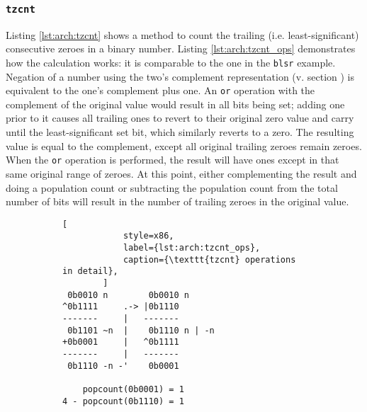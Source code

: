 \subsubsection{\texttt{tzcnt}}

Listing \ref{lst:arch:tzcnt} shows a method to count the trailing (i.e.
least-significant) consecutive zeroes in a binary number.  Listing
\ref{lst:arch:tzcnt_ops} demonstrates how the calculation works: it is
comparable to the one in the \texttt{blsr} example.  Negation of a number using
the two's complement representation (v. section
) is equivalent to the one's complement plus
one.  An \texttt{or} operation with the complement of the original value would
result in all bits being set; adding one prior to it causes all trailing ones to
revert to their original zero value and carry until the least-significant set
bit, which similarly reverts to a zero.  The resulting value is equal to the
complement, except all original trailing zeroes remain zeroes.  When the
\texttt{or} operation is performed, the result will have ones except in that
same original range of zeroes.  At this point, either complementing the result
and doing a population count or subtracting the population count from the total
number of bits will result in the number of trailing zeroes in the original
value.

\begin{figure}[ht]
    \centering
    \vspace{-\baselineskip}
    \begin{subfigure}[t]{0.5\textwidth}
        
    \end{subfigure}
    \hspace{4em}
    \begin{subfigure}[t]{0.375\textwidth}
        \begin{lstlisting}[
            style=x86,
            label={lst:arch:tzcnt_ops},
            caption={\texttt{tzcnt} operations in detail},
        ]
 0b0010 n        0b0010 n
^0b1111     .-> |0b1110
-------     |   -------
 0b1101 ~n  |    0b1110 n | -n
+0b0001     |   ^0b1111
-------     |   -------
 0b1110 -n -'    0b0001

    popcount(0b0001) = 1
4 - popcount(0b1110) = 1
        \end{lstlisting}
    \end{subfigure}
    \vspace{-2\baselineskip}
\end{figure}

